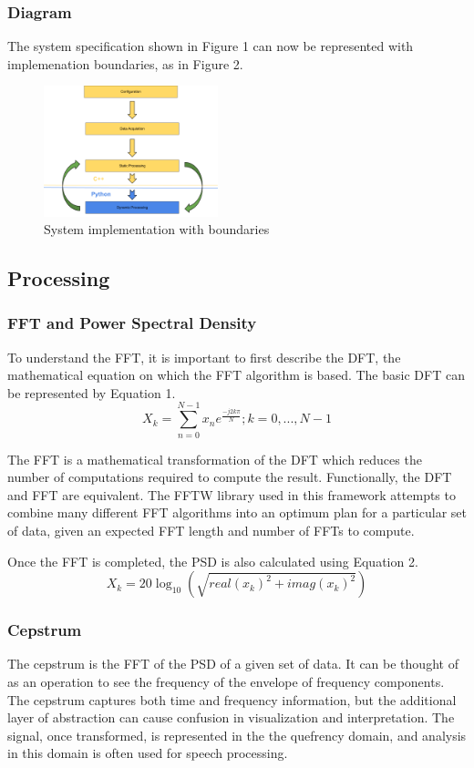 \documentclass[journal]{IEEEtran}
\begin{document}
\subsubsection{Diagram}
The system specification shown in Figure 1 can now be represented with implemenation boundaries, as in Figure 2.
\begin{figure}[h!]
\centering
  \includegraphics[width=0.45\textwidth]{fig2.png}
\caption{System implementation with boundaries}
\end{figure}

\subsection{Processing}
\subsubsection{FFT and Power Spectral Density}
To understand the FFT, it is important to first describe the DFT, the mathematical equation on which the FFT algorithm is based.
The basic DFT can be represented by Equation 1. \cite{DSPBook}
\begin{equation}
X_k = \sum_{n=0}^{N-1}x_ne^{\frac{-j2k\pi}{N}};k = 0,...,N-1
\end{equation}

The FFT is a mathematical transformation of the DFT which reduces the number of computations required to compute the result. 
Functionally, the DFT and FFT are equivalent. The FFTW library used in this framework attempts to combine many different FFT algorithms into
 an optimum plan for a particular set of data, given an expected FFT length and number of FFTs to compute.

Once the FFT is completed, the PSD is also calculated using Equation 2. \cite{DSPBook}
\begin{equation}
X_k = 20\log_{10}(\sqrt{real(x_k)^2 + imag(x_k)^2})
\end{equation}

\subsubsection{Cepstrum}
The cepstrum is the FFT of the PSD of a given set of data. It can be thought of as an operation to see the frequency of the envelope of
 frequency components. The cepstrum captures both time and frequency information, but the additional layer of abstraction can cause confusion in 
visualization and interpretation. The signal, once transformed, is represented in the the quefrency domain, and analysis in this domain is 
often used for speech processing. \cite{DSPBook, AudioBook}
\end{document}
